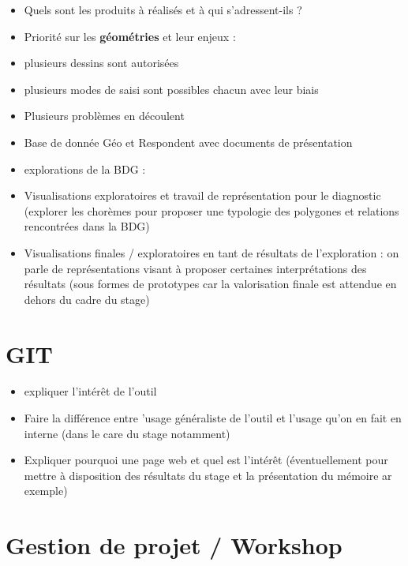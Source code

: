 \documentclass[
  a4paper,
]{scrbook}
\providecommand{\tightlist}{%
  \setlength{\itemsep}{0pt}\setlength{\parskip}{0pt}}\usepackage{longtable,booktabs,array}
\begin{document}
\begin{itemize}
\tightlist
\item
  Quels sont les produits à réalisés et à qui s'adressent-ils ?
\item
  Priorité sur les \textbf{géométries} et leur enjeux :
\item
  plusieurs dessins sont autorisées
\item
  plusieurs modes de saisi sont possibles chacun avec leur biais
\item
  Plusieurs problèmes en découlent
\item
  Base de donnée Géo et Respondent avec documents de présentation
\item
  explorations de la BDG :
\item
  Visualisations exploratoires et travail de représentation pour le
  diagnostic (explorer les chorèmes pour proposer une typologie des
  polygones et relations rencontrées dans la BDG)
\item
  Visualisations finales / exploratoires en tant de résultats de
  l'exploration : on parle de représentations visant à proposer
  certaines interprétations des résultats (sous formes de prototypes car
  la valorisation finale est attendue en dehors du cadre du stage)
\end{itemize}

\hypertarget{git}{%
\section{GIT}\label{git}}

\begin{itemize}
\tightlist
\item
  expliquer l'intérêt de l'outil
\item
  Faire la différence entre 'usage généraliste de l'outil et l'usage
  qu'on en fait en interne (dans le care du stage notamment)
\item
  Expliquer pourquoi une page web et quel est l'intérêt (éventuellement
  pour mettre à disposition des résultats du stage et la présentation du
  mémoire ar exemple)
\end{itemize}

\hypertarget{gestion-de-projet-workshop}{%
\section{Gestion de projet /
Workshop}\label{gestion-de-projet-workshop}}
\end{document}

